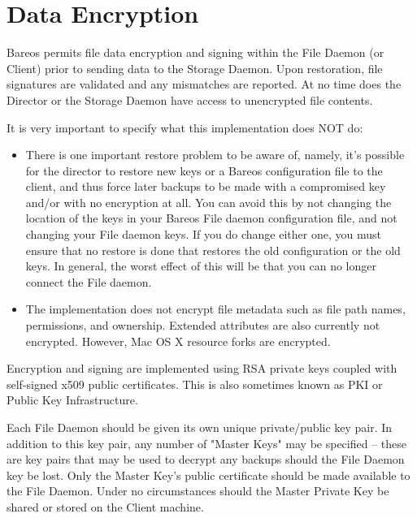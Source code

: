 
\chapter{Data Encryption}
\label{DataEncryption}

Bareos permits file data encryption and signing within the File Daemon (or
Client) prior to sending data to the Storage Daemon.  Upon restoration,
file signatures are validated and any mismatches are reported.  At no time
does the Director or the Storage Daemon have access to unencrypted file
contents.


It is very important to specify what this implementation does NOT
do:
\begin{itemize}
\item There is one important restore problem to be aware of, namely, it's
  possible for the director to restore new keys or a Bareos configuration
  file to the client, and thus force later backups to be made with a
  compromised key and/or with no encryption at all.  You can avoid this by
  not changing the location of the keys in your Bareos File daemon
  configuration file, and not changing your File daemon keys.  If you do
  change either one, you must ensure that no restore is done that restores
  the old configuration or the old keys.  In general, the worst effect of
  this will be that you can no longer connect the File daemon.

\item The implementation does not encrypt file metadata such as file path
  names, permissions, and ownership. Extended attributes are also currently
  not encrypted. However, Mac OS X resource forks are encrypted.
\end{itemize}

Encryption and signing are implemented using RSA private keys coupled with
self-signed x509 public certificates. This is also sometimes known as PKI
or Public Key Infrastructure.

Each File Daemon should be given its own unique private/public key pair.
In addition to this key pair, any number of "Master Keys" may be specified
-- these are key pairs that may be used to decrypt any backups should the
File Daemon key be lost.  Only the Master Key's public certificate should
be made available to the File Daemon.  Under no circumstances should the
Master Private Key be shared or stored on the Client machine.

